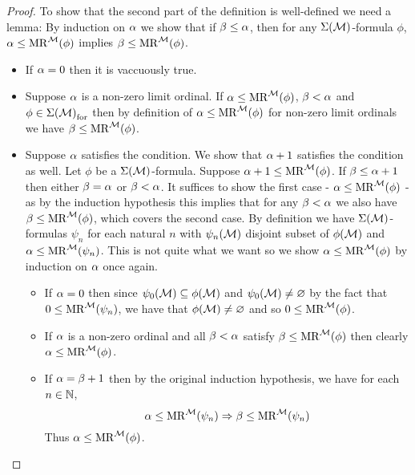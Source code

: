 \begin{proof}
    To show that the second part of the definition is well-defined
    we need a lemma:
    By induction on $\alpha$ we show that if $\beta \leq \alpha$,
    then for any $\Sigma(\mathcal{M})$-formula $\phi$,
    $\alpha \leq \mathrm{MR}^{\mathcal{M}}(\phi)$ implies $\beta \leq \mathrm{MR}^{\mathcal{M}}(\phi)$.
    \begin{itemize}
        \item If $\alpha = 0$ then it is vaccuously true.
        \item Suppose $\alpha$ is a non-zero limit ordinal.
            If $\alpha \leq \mathrm{MR}^{\mathcal{M}}(\phi)$, $\beta < \alpha$ and 
            $\phi \in {\Sigma(\mathcal{M})}_\mathrm{for}$ then by definition of 
            $\alpha \leq \mathrm{MR}^{\mathcal{M}}(\phi)$ for non-zero limit ordinals
            we have $\beta \leq \mathrm{MR}^{\mathcal{M}}(\phi)$.
        \item Suppose $\alpha$ satisfies the condition. 
            We show that $\alpha + 1$ satisfies the condition as well.
            Let $\phi$ be a $\Sigma(\mathcal{M})$-formula.
            Suppose $\alpha + 1 \leq \mathrm{MR}^{\mathcal{M}}(\phi)$.
            If $\beta \leq \alpha + 1$ then either $\beta = \alpha$ or $\beta < \alpha$.
            It suffices to show the first case - $\alpha \leq \mathrm{MR}^{\mathcal{M}}(\phi)$ - 
            as by the induction hypothesis this implies that for any $\beta < \alpha$
            we also have $\beta \leq \mathrm{MR}^{\mathcal{M}}(\phi)$, 
            which covers the second case.
            By definition we have $\Sigma(\mathcal{M})$-formulas $\psi_n$ for each natural
            $n$ with $\psi_n(\mathcal{M})$ disjoint subset of $\phi(\mathcal{M})$ and 
            $\alpha \leq \mathrm{MR}^{\mathcal{M}}(\psi_n)$.
            This is not quite what we want so we 
            show $\alpha \leq \mathrm{MR}^{\mathcal{M}}(\phi)$ by induction on $\alpha$ once again.
            \begin{itemize}
                \item If $\alpha = 0$ then since $\psi_0(\mathcal{M}) \subseteq \phi(\mathcal{M})$
                    and $\psi_0(\mathcal{M}) \ne \varnothing$ by the fact that 
                    $0 \leq \mathrm{MR}^{\mathcal{M}}(\psi_n)$, 
                    we have that $\phi(\mathcal{M}) \ne \varnothing$ and so 
                    $0 \leq \mathrm{MR}^{\mathcal{M}}(\phi)$.
                \item If $\alpha$ is a non-zero ordinal and all $\beta < \alpha$
                    satisfy $\beta \leq \mathrm{MR}^{\mathcal{M}}(\phi)$ then clearly 
                    $\alpha \leq \mathrm{MR}^{\mathcal{M}}(\phi)$.
                \item If $\alpha = \beta + 1$ 
                    then by the original induction hypothesis, 
                    we have for each $n \in \mathbb{N}$, 
                    \[\alpha \leq \mathrm{MR}^{\mathcal{M}}(\psi_n) \Rightarrow 
                    \beta \leq \mathrm{MR}^{\mathcal{M}}(\psi_n)\]
                    Thus $\alpha \leq \mathrm{MR}^{\mathcal{M}}(\phi)$.
            \end{itemize}
    \end{itemize}


\end{proof}
